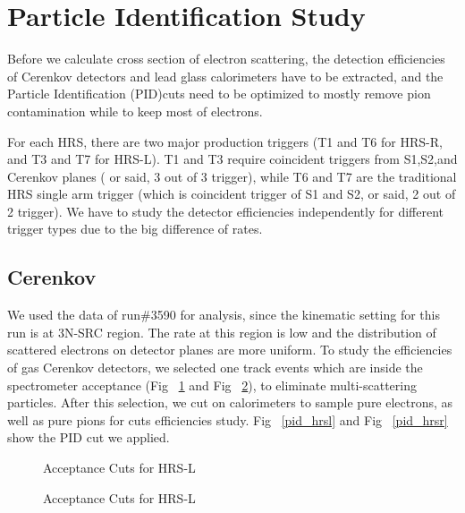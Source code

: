 \section{Particle Identification Study}

 Before we calculate cross section of electron scattering, the detection efficiencies of Cerenkov detectors and lead glass calorimeters have to be extracted, and the Particle Identification (PID)cuts need to be optimized to mostly remove pion contamination while to keep most of electrons.
 
 For each HRS, there are two major production triggers (T1 and T6 for HRS-R, and T3 and T7 for HRS-L). T1 and T3 require coincident triggers from S1,S2,and Cerenkov planes ( or said, 3 out of 3 trigger), while T6 and T7 are the traditional HRS single arm trigger (which is coincident trigger of S1 and S2, or said, 2 out of 2 trigger). We have to study the detector efficiencies independently for different trigger types due to the big difference of rates. 

\subsection{Cerenkov}

We used the data of run\#3590 for analysis, since the kinematic setting for this run is at 3N-SRC region. The rate at this region is low and the distribution of scattered electrons on detector planes are more uniform. To study the efficiencies of gas Cerenkov detectors, we selected one track events which are inside the spectrometer acceptance (Fig ~\ref{acc_hrsl} and Fig ~\ref{acc_hrsr}), to eliminate multi-scattering particles. After this selection, we cut on calorimeters to sample pure electrons, as well as pure pions for cuts efficiencies study. Fig ~\ref{pid_hrsl} and Fig ~\ref{pid_hrsr} show the PID cut we applied. 

\begin{figure}[htb]
\centerline{}
\caption[Acceptance Cuts for HRS-L]{\footnotesize{Acceptance Cuts for HRS-L}
\label{acc_hrsl}}
\end{figure}

\begin{figure}[htb]
\centerline{}
\caption[Acceptance Cuts for HRS-L]{\footnotesize{Acceptance Cuts for HRS-L}
\label{acc_hrsr}}
\end{figure}


